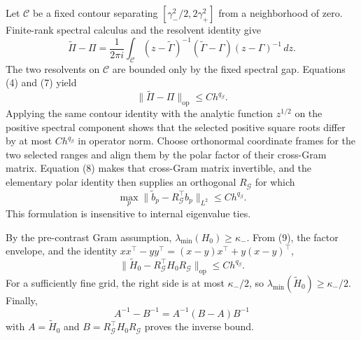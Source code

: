 Let \(\mathscr C\) be a fixed contour separating \([\gamma_-^2/2,2\gamma_+^2]\) from a neighborhood of zero. Finite-rank spectral calculus and the resolvent identity give
\[
 \widetilde\Pi-\Pi
 =\frac{1}{2\pi i}\int_{\mathscr C}
 (z-\widetilde\Gamma)^{-1}(\widetilde\Gamma-\Gamma)(z-\Gamma)^{-1}\,dz. \tag{7}
\]
The two resolvents on \(\mathscr C\) are bounded only by the fixed spectral gap. Equations (4) and (7) yield
\[
 \|\widetilde\Pi-\Pi\|_{\mathrm{op}}\le C h^{q_\beta}. \tag{8}
\]
Applying the same contour identity with the analytic function \(z^{1/2}\) on the positive spectral component shows that the selected positive square roots differ by at most \(Ch^{q_\beta}\) in operator norm. Choose orthonormal coordinate frames for the two selected ranges and align them by the polar factor of their cross-Gram matrix. Equation (8) makes that cross-Gram matrix invertible, and the elementary polar identity then supplies an orthogonal \(R_{\mathcal G}\) for which
\[
 \max_p\|\widetilde b_p-R_{\mathcal G}^{\top}b_p\|_{L^2}
 \le C h^{q_\beta}. \tag{9}
\]
This formulation is insensitive to internal eigenvalue ties.

By the pre-contrast Gram assumption, \(\lambda_{\min}(H_0)\ge\kappa_-\). From (9), the factor envelope, and the identity \(xx^\top-yy^\top=(x-y)x^\top+y(x-y)^\top\),
\[
 \|\widetilde H_0-R_{\mathcal G}^{\top}H_0R_{\mathcal G}\|_{\mathrm{op}}
 \le C h^{q_\beta}. \tag{10}
\]
For a sufficiently fine grid, the right side is at most \(\kappa_-/2\), so \(\lambda_{\min}(\widetilde H_0)\ge\kappa_-/2\). Finally,
\[
 A^{-1}-B^{-1}=A^{-1}(B-A)B^{-1} \tag{11}
\]
with \(A=\widetilde H_0\) and \(B=R_{\mathcal G}^{\top}H_0R_{\mathcal G}\) proves the inverse bound.

